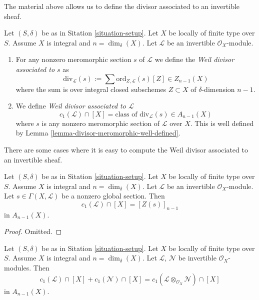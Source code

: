 \noindent
The material above allows us to define the divisor
associated to an invertible sheaf.

\begin{definition}
\label{definition-divisor-invertible-sheaf}
Let $(S, \delta)$ be as in Sitation \ref{situation-setup}.
Let $X$ be locally of finite type over $S$. Assume $X$ is
integral and $n = \dim_\delta(X)$.
Let $\mathcal{L}$ be an invertible $\mathcal{O}_X$-module.
\begin{enumerate}
\item For any nonzero meromorphic section $s$ of $\mathcal{L}$
we define the {\it Weil divisor associated to $s$} as
$$
\text{div}_{\mathcal{L}}(s) :=
\sum \text{ord}_{Z, \mathcal{L}}(s) [Z] \in Z_{n - 1}(X)
$$
where the sum is over integral closed subschemes $Z \subset X$
of $\delta$-dimension $n - 1$.
\item We define {\it Weil divisor associated to $\mathcal{L}$}
$$
c_1(\mathcal{L}) \cap [X] =
\text{class of }\text{div}_{\mathcal{L}}(s) \in A_{n - 1}(X)
$$
where $s$ is any nonzero meromorphic section of $\mathcal{L}$ over
$X$. This is well defined by
Lemma \ref{lemma-divisor-meromorphic-well-defined}.
\end{enumerate}
\end{definition}

\noindent
There are some cases where it is easy to compute the
Weil divisor associated to an invertible sheaf.

\begin{lemma}
\label{lemma-compute-c1}
Let $(S, \delta)$ be as in Sitation \ref{situation-setup}.
Let $X$ be locally of finite type over $S$. Assume $X$ is
integral and $n = \dim_\delta(X)$.
Let $\mathcal{L}$ be an invertible $\mathcal{O}_X$-module.
Let $s \in \Gamma(X, \mathcal{L})$ be a nonzero global section.
Then
$$
c_1(\mathcal{L}) \cap [X] = [Z(s)]_{n - 1}
$$
in $A_{n - 1}(X)$.
\end{lemma}

\begin{proof}
Omitted.
\end{proof}

\begin{lemma}
\label{lemma-c1-additive}
Let $(S, \delta)$ be as in Sitation \ref{situation-setup}.
Let $X$ be locally of finite type over $S$. Assume $X$ is
integral and $n = \dim_\delta(X)$.
Let $\mathcal{L}$, $\mathcal{N}$ be invertible $\mathcal{O}_X$-modules.
Then
$$
c_1(\mathcal{L}) \cap [X] + c_1(\mathcal{N}) \cap [X] =
c_1(\mathcal{L} \otimes_{\mathcal{O}_X} \mathcal{N}) \cap [X]
$$
in $A_{n - 1}(X)$.
\end{lemma}

